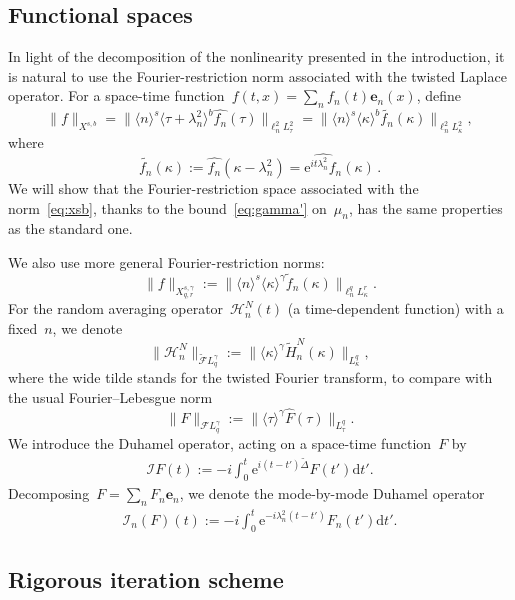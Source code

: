 \documentclass[11pt,reqno,english]{amsart}
\numberwithin{equation}{section}
\theoremstyle{plain}
\theoremstyle{definition}
\theoremstyle{remark}
\newcommand{\la}{\langle}
\newcommand{\ra}{\rangle}
\newcommand{\e}{\mathrm{e}}
\begin{document}
\subsection{Functional spaces}
In light of the decomposition of the nonlinearity presented in the introduction, it is natural to use the Fourier-restriction norm associated with the twisted Laplace operator. For a space-time function~$f(t,x)=\sum_{n}f_n(t)\mathbf{e}_n(x)$, define
\begin{equation}
	\label{eq:xsb}
	\|f\|_{X^{s,b}} =
	\|
	\langle n\rangle^{s}\langle \tau + \lambda_{n}^{2} \rangle^{b}
	\widehat{f_{n}}(\tau)
	\|_{\ell_{n}^{2}L_{\tau}^{2}}
	=
	\|\langle n\rangle^{s}
	\langle \kappa \rangle^{b}
	\widetilde{f_{n}}(\kappa)
	\|_{\ell_{n}^{2}L_{\kappa}^{2}},
\end{equation}
where
\[
\widetilde{f_{n}}(\kappa):=\widehat{f_{n}}(\kappa-\lambda_{n}^{2})
= \widehat{\e^{it\lambda_{n}^{2}}f_{n}}(\kappa)\,.
\]
We will show that the Fourier-restriction space associated with the norm~\eqref{eq:xsb}, thanks to the bound~\eqref{eq:gamma'} on~$\mu_{n}$, has the same properties as the standard one.

We also use more general Fourier-restriction norms:
\[
\|f\|_{X_{q,r}^{s,\gamma}}:=\|\la n\ra^s\la\kappa\ra^{\gamma}\widetilde{f}_n(\kappa) \|_{\ell_n^qL_{\kappa}^r}.
\]
For the random averaging operator~$\mathcal{H}_n^N(t)$ (a time-dependent function) with a fixed~$n$, we denote
\[
\|\mathcal{H}_n^N \|_{\widetilde{\mathcal{F}}L_q^{\gamma}}:=\|\la\kappa\ra^{\gamma}\widetilde{H}_n^N(\kappa)\|_{L_{\kappa}^q},
\]
where the wide tilde stands for the twisted Fourier transform, to compare with the usual Fourier--Lebesgue norm
\[
\|F\|_{\mathcal{F}L_q^{\gamma}}:=\|\la\tau\ra^{\gamma}\widehat{F}(\tau) \|_{L_{\tau}^q}.
\]
We introduce the Duhamel operator, acting on a space-time function~$F$ by
\begin{align}\label{def:Duhamel}
	\mathcal{I}F(t):=-i\int_0^t\e^{i(t-t')\widetilde{\Delta}}F(t') \mathrm{d}t'.
\end{align}
Decomposing~$F=\sum_{n}F_n\mathbf{e}_n$, we denote the mode-by-mode Duhamel operator
\begin{align}\label{def:Duhameln}
	\mathcal{I}_n(F)(t):=-i\int_0^t\e^{-i\lambda_n^2(t-t')}F_n(t')\mathrm{d}t'.
\end{align}


\subsection{Rigorous iteration scheme}
\end{document}
